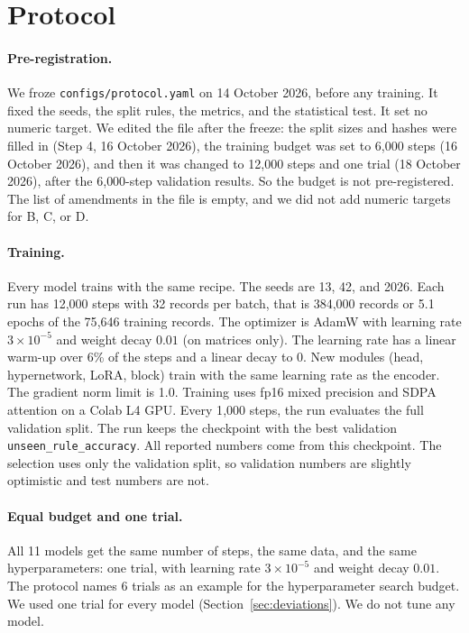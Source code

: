 \documentclass[11pt,a4paper]{article}
\newcommand{\ura}{\texttt{unseen\_\allowbreak rule\_\allowbreak accuracy}}
\begin{document}
\section{Protocol}\label{sec:protocol}

\paragraph{Pre-registration.}
We froze \texttt{configs/protocol.yaml} on 14 October 2026, before any training.
It fixed the seeds, the split rules, the metrics, and the statistical test.
It set no numeric target.
We edited the file after the freeze: the split sizes and hashes were filled in (Step 4, 16 October 2026), the training budget was set to 6{,}000 steps (16 October 2026), and then it was changed to 12{,}000 steps and one trial (18 October 2026), after the 6{,}000-step validation results.
So the budget is not pre-registered.
The list of amendments in the file is empty, and we did not add numeric targets for B, C, or D.

\paragraph{Training.}
Every model trains with the same recipe.
The seeds are 13, 42, and 2026.
Each run has 12{,}000 steps with 32 records per batch, that is 384{,}000 records or 5.1 epochs of the 75{,}646 training records.
The optimizer is AdamW with learning rate $3 \times 10^{-5}$ and weight decay $0.01$ (on matrices only).
The learning rate has a linear warm-up over 6\% of the steps and a linear decay to 0.
New modules (head, hypernetwork, LoRA, block) train with the same learning rate as the encoder.
The gradient norm limit is 1.0.
Training uses fp16 mixed precision and SDPA attention on a Colab L4 GPU.
Every 1{,}000 steps, the run evaluates the full validation split.
The run keeps the checkpoint with the best validation \ura{}.
All reported numbers come from this checkpoint.
The selection uses only the validation split, so validation numbers are slightly optimistic and test numbers are not.

\paragraph{Equal budget and one trial.}
All 11 models get the same number of steps, the same data, and the same hyperparameters: one trial, with learning rate $3\times10^{-5}$ and weight decay $0.01$.
The protocol names 6 trials as an example for the hyperparameter search budget.
We used one trial for every model (Section~\ref{sec:deviations}).
We do not tune any model.
\end{document}
